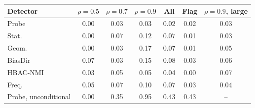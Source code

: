 \begin{tabular}{lcccccc}
\toprule
Detector & $\rho=0.5$ & $\rho=0.7$ & $\rho=0.9$ & All & Flag & $\rho=0.9$, large \\
\midrule
Probe & 0.00 & 0.03 & 0.03 & 0.02 & 0.02 & 0.03 \\
Stat. & 0.00 & 0.07 & 0.12 & 0.07 & 0.01 & 0.03 \\
Geom. & 0.00 & 0.03 & 0.17 & 0.07 & 0.01 & 0.05 \\
BiasDir & 0.07 & 0.03 & 0.15 & 0.08 & 0.03 & 0.06 \\
HBAC-NMI & 0.03 & 0.05 & 0.05 & 0.04 & 0.00 & 0.07 \\
Freq. & 0.05 & 0.07 & 0.10 & 0.07 & 0.03 & 0.04 \\
\midrule
Probe, unconditional & 0.00 & 0.35 & 0.95 & 0.43 & 0.43 & -- \\
\bottomrule
\end{tabular}
